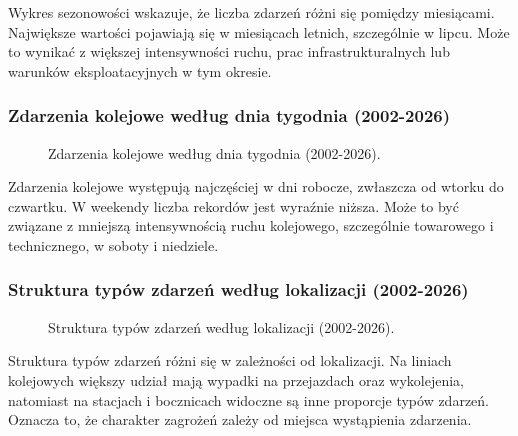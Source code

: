 \documentclass[12pt]{article}
\begin{document}
Wykres sezonowości wskazuje, że liczba zdarzeń różni się pomiędzy miesiącami. Największe wartości pojawiają się w miesiącach letnich, szczególnie w lipcu. Może to wynikać z większej intensywności ruchu, prac infrastrukturalnych lub warunków eksploatacyjnych w tym okresie.

\subsubsection{Zdarzenia kolejowe według dnia tygodnia (2002-2026)}
\begin{figure}[H]
    \centering
    
    \caption{Zdarzenia kolejowe według dnia tygodnia (2002-2026).}
\end{figure}

Zdarzenia kolejowe występują najczęściej w dni robocze, zwłaszcza od wtorku do czwartku. W weekendy liczba rekordów jest wyraźnie niższa. Może to być związane z mniejszą intensywnością ruchu kolejowego, szczególnie towarowego i technicznego, w soboty i niedziele.

\subsubsection{Struktura typów zdarzeń według lokalizacji (2002-2026)}
\begin{figure}[H]
    \centering
    
    \caption{Struktura typów zdarzeń według lokalizacji (2002-2026).}
\end{figure}


Struktura typów zdarzeń różni się w zależności od lokalizacji. Na liniach kolejowych większy udział mają wypadki na przejazdach oraz wykolejenia, natomiast na stacjach i bocznicach widoczne są inne proporcje typów zdarzeń. Oznacza to, że charakter zagrożeń zależy od miejsca wystąpienia zdarzenia.


\newpage
\end{document}
